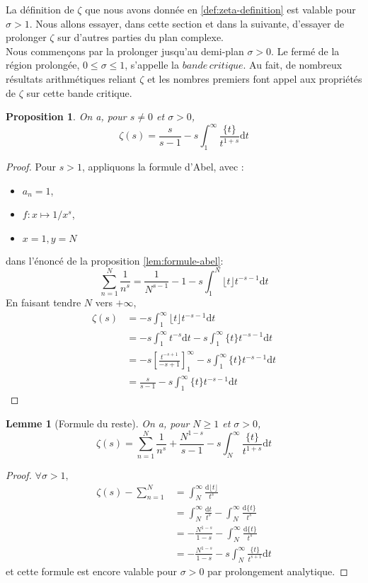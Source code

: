 \documentclass[french]{report}
\newtheorem{proposition}[theorem]{Proposition}
\newtheorem{lemma}[theorem]{Lemme}
\begin{document}
La définition de $\zeta$ que nous avons donnée en \ref{def:zeta-definition} est valable pour $\sigma>1$. Nous allons essayer, dans cette section et dans la suivante, d'essayer de prolonger $\zeta$ sur d'autres parties du plan complexe. \\

Nous commençons par la prolonger jusqu'au demi-plan $\sigma>0$. Le fermé de la région prolongée, $0\leq\sigma\leq1$, s'appelle la $bande\,critique$. Au fait, de nombreux résultats arithmétiques reliant $\zeta$ et les nombres premiers font appel aux propriétés de $\zeta$ sur cette bande critique.

\begin{proposition} On a, pour $s\neq0$ et $\sigma>0$,
  \[ \zeta(s) = \frac{s}{s-1}-s\int_1^\infty\frac{\{t\}}{t^{1+s}}\mathrm{d}t \]
\end{proposition}

\begin{proof}
  Pour $s>1$, appliquons la formule d'Abel, avec :
  \begin{itemize}
    \item $a_n=1$,
    \item $f:x\mapsto 1/x^s$,
    \item $x=1, y=N$
  \end{itemize}
  dans l'énoncé de la proposition \ref{lem:formule-abel}:
  \[
    \sum_{n=1}^N\frac{1}{n^s}
    = \frac{1}{N^{s-1}} - 1 - s\int_1^N\lfloor t\rfloor t^{-s-1}\mathrm{d}t
  \]
  En faisant tendre $N$ vers $+\infty$,
  \begin{align*}
    \zeta(s)
    &= - s\int_1^\infty\lfloor t\rfloor t^{-s-1}\mathrm{d}t \\
    &= - s\int_1^\infty t^{-s}\mathrm{d}t - s\int_1^\infty \{t\}t^{-s-1}\mathrm{d}t \\
    &= -s\left[\frac{t^{-s+1}}{-s+1}\right]_1^\infty - s\int_1^\infty \{t\}t^{-s-1}\mathrm{d}t \\
    &= \frac{s}{s-1} - s\int_1^\infty \{t\}t^{-s-1}\mathrm{d}t
  \end{align*}
\end{proof}


\begin{lemma}[Formule du reste]\label{lem:formule-du-reste}
  On a, pour $N\geq1$ et $\sigma>0$,
  \[
    \zeta(s)
    = \sum_{n=1}^N\frac{1}{n^s}
    + \frac{N^{1-s}}{s-1}-s\int_N^{\infty}\frac{\{t\}}{t^{1+s}}\mathrm{d}t
  \]
\end{lemma}

\begin{proof}
  $\forall\sigma>1,$
  \begin{align*}
    \zeta(s)-\sum_{n=1}^N
    &= \int_N^\infty\frac{\mathrm{d}\lfloor t\rfloor}{t^s} \\
    &= \int_N^\infty\frac{\mathrm{d}t}{t^s} - \int_N^\infty\frac{\mathrm{d}\{t\}}{t^s} \\
    & = -\frac{N^{1-s}}{1-s} - \int_N^\infty\frac{\mathrm{d}\{t\}}{t^s} \\
    & = -\frac{N^{1-s}}{1-s} - s\int_N^\infty\frac{\{t\}}{t^{s+1}}\mathrm{d}t
  \end{align*}
  et cette formule est encore valable pour $\sigma>0$ par prolongement analytique.
\end{proof}
\end{document}
